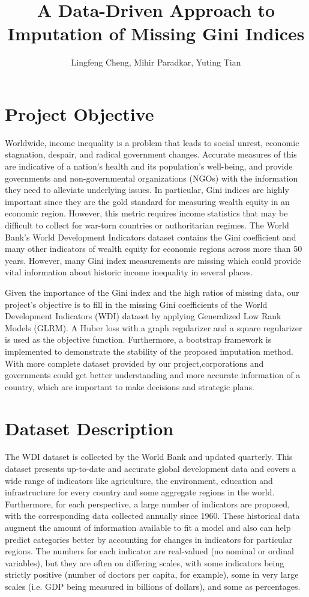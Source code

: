 \documentclass[a4paper]{article}
\title{A Data-Driven Approach to Imputation of Missing Gini Indices}
\author{Lingfeng Cheng, Mihir Paradkar, Yuting Tian}
\begin{document}
\maketitle



\section{Project Objective}
Worldwide, income inequality is a problem that leads to social unrest, economic stagnation, despair, and radical government changes. Accurate measures of this are indicative of a nation's health and its population's well-being, and provide governments and non-governmental organizations (NGOs) with the information they need to alleviate underlying issues. In particular, Gini indices are highly important since they are the gold standard for measuring wealth equity in an economic region. However, this metric requires income statistics that may be difficult to collect for war-torn countries or authoritarian regimes. The World Bank's World Development Indicators dataset contains the Gini coefficient and many other indicators of wealth equity for economic regions across more than 50 years. However, many Gini index measurements are missing which could provide vital information about historic income inequality in several places.

Given the importance of the Gini index and the high ratios of missing data, our project's objective is to fill in the missing Gini coefficients of the World Development Indicators (WDI) dataset by applying  Generalized Low Rank Models (GLRM). A Huber loss with a graph regularizer and a square regularizer is used as the objective function. Furthermore, a bootstrap framework is implemented to demonstrate the stability of the proposed imputation method. With more complete dataset provided by our project,corporations and governments could get better understanding and more accurate information of a country, which are important to make decisions and strategic plans.

\section{Dataset Description}
The WDI dataset is collected by the World Bank and updated quarterly. This dataset presents up-to-date and accurate global development data and covers a wide range of indicators like agriculture, the environment, education and infrastructure for every country and some aggregate regions in the world. Furthermore, for each perspective, a large number of indicators are proposed, with the corresponding data collected annually since 1960. These historical data augment the amount of information available to fit a model and also can help predict categories better by accounting for changes in indicators for particular regions. The numbers for each indicator are real-valued (no nominal or ordinal variables), but they are often on differing scales, with some indicators being strictly positive (number of doctors per capita, for example), some in very large scales (i.e. GDP being measured in billions of dollars), and some as percentages.
\end{document}
